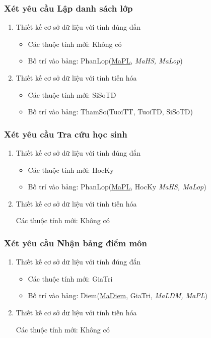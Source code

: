 \documentclass[a4paper]{article}
\begin{document}
	\subsubsection{Xét yêu cầu Lập danh sách lớp}
\begin{enumerate}
\item Thiết kế cơ sở dữ liệu với tính đúng đắn
\begin{itemize}
\item Các thuộc tính mới: Không có
\item Bố trí vào bảng: PhanLop(\underline{MaPL}, \textit{MaHS, MaLop})
\end{itemize}
\item Thiết kế cơ sở dữ liệu với tính tiến hóa
\begin{itemize}
\item Các thuộc tính mới: SiSoTD
\item Bố trí vào bảng: ThamSo(TuoiTT, TuoiTD, SiSoTD)
\end{itemize}
\end{enumerate}
	
	\subsubsection{Xét yêu cầu Tra cứu học sinh}
\begin{enumerate}
\item Thiết kế cơ sở dữ liệu với tính đúng đắn
\begin{itemize}
\item Các thuộc tính mới: HocKy
\item Bố trí vào bảng: PhanLop(\underline{MaPL}, HocKy \textit{MaHS, MaLop})
\end{itemize}
\item Thiết kế cơ sở dữ liệu với tính tiến hóa

Các thuộc tính mới: Không có
\end{enumerate}


\subsubsection{Xét yêu cầu Nhận bảng điểm môn}
\begin{enumerate}
\item Thiết kế cơ sở dữ liệu với tính đúng đắn
\begin{itemize}
\item Các thuộc tính mới: GiaTri
\item Bố trí vào bảng: Diem(\underline{MaDiem}, GiaTri, \textit{MaLDM, MaPL})
\end{itemize}
\item Thiết kế cơ sở dữ liệu với tính tiến hóa

Các thuộc tính mới: Không có
\end{enumerate}
\end{document}

